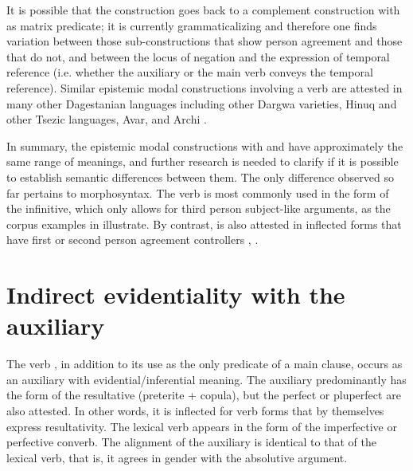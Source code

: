 It is possible that the construction goes back to a complement construction with  as matrix predicate; it is currently grammaticalizing and therefore one finds variation between those sub-constructions that show person agreement and those that do not, and between the locus of negation and the expression of temporal reference (i.e. whether the auxiliary or the main verb conveys the temporal reference). Similar epistemic modal constructions involving a verb  are attested in many other Dagestanian languages including other Dargwa varieties, Hinuq and other Tsezic languages, Avar, and Archi \citep{Forker2018a, Forker2018b}.

In summary, the epistemic modal constructions with   and   have approximately the same range of meanings, and further research is needed to clarify if it is possible to establish semantic differences between them. The only difference observed so far pertains to morphosyntax. The verb  is most commonly used in the form of the infinitive, which only allows for third person subject-like arguments, as the corpus examples in  illustrate. By contrast,  is also attested in inflected forms that have first or second person agreement controllers , .



\section{Indirect evidentiality with the auxiliary \protect{} \protect{}}
\label{sec:Indirect evidentiality with the auxiliary b-uz be, be at, stay, remain}

The verb  , in addition to its use as the only predicate of a main clause, occurs as an auxiliary with evidential\slash inferential meaning. The auxiliary predominantly has the form of the resultative (preterite + copula), but the perfect or pluperfect are also attested. In other words, it is inflected for verb forms that by themselves express resultativity. The lexical verb appears in the form of the imperfective or perfective converb. The alignment of the auxiliary is identical to that of the lexical verb, that is, it agrees in gender with the absolutive argument.

